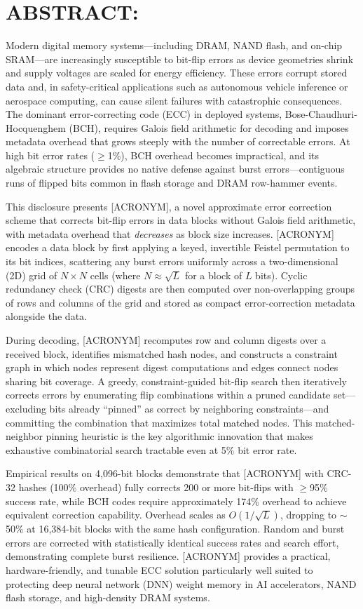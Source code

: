\section*{ABSTRACT:}
\noindent

Modern digital memory systems---including DRAM, NAND flash, and on-chip SRAM---are increasingly susceptible to bit-flip errors as device geometries shrink and supply voltages are scaled for energy efficiency. These errors corrupt stored data and, in safety-critical applications such as autonomous vehicle inference or aerospace computing, can cause silent failures with catastrophic consequences. The dominant error-correcting code (ECC) in deployed systems, Bose-Chaudhuri-Hocquenghem (BCH), requires Galois field arithmetic for decoding and imposes metadata overhead that grows steeply with the number of correctable errors. At high bit error rates ($\geq$1\%), BCH overhead becomes impractical, and its algebraic structure provides no native defense against burst errors---contiguous runs of flipped bits common in flash storage and DRAM row-hammer events.

This disclosure presents [ACRONYM], a novel approximate error correction scheme that corrects bit-flip errors in data blocks without Galois field arithmetic, with metadata overhead that \emph{decreases} as block size increases. [ACRONYM] encodes a data block by first applying a keyed, invertible Feistel permutation to its bit indices, scattering any burst errors uniformly across a two-dimensional (2D) grid of $N \times N$ cells (where $N \approx \sqrt{L}$ for a block of $L$ bits). Cyclic redundancy check (CRC) digests are then computed over non-overlapping groups of rows and columns of the grid and stored as compact error-correction metadata alongside the data.

During decoding, [ACRONYM] recomputes row and column digests over a received block, identifies mismatched hash nodes, and constructs a constraint graph in which nodes represent digest computations and edges connect nodes sharing bit coverage. A greedy, constraint-guided bit-flip search then iteratively corrects errors by enumerating flip combinations within a pruned candidate set---excluding bits already ``pinned'' as correct by neighboring constraints---and committing the combination that maximizes total matched nodes. This matched-neighbor pinning heuristic is the key algorithmic innovation that makes exhaustive combinatorial search tractable even at 5\% bit error rate.

Empirical results on 4,096-bit blocks demonstrate that [ACRONYM] with CRC-32 hashes (100\% overhead) fully corrects 200 or more bit-flips with $\geq$95\% success rate, while BCH codes require approximately 174\% overhead to achieve equivalent correction capability. Overhead scales as $O(1/\sqrt{L})$, dropping to $\sim$50\% at 16,384-bit blocks with the same hash configuration. Random and burst errors are corrected with statistically identical success rates and search effort, demonstrating complete burst resilience. [ACRONYM] provides a practical, hardware-friendly, and tunable ECC solution particularly well suited to protecting deep neural network (DNN) weight memory in AI accelerators, NAND flash storage, and high-density DRAM systems.

